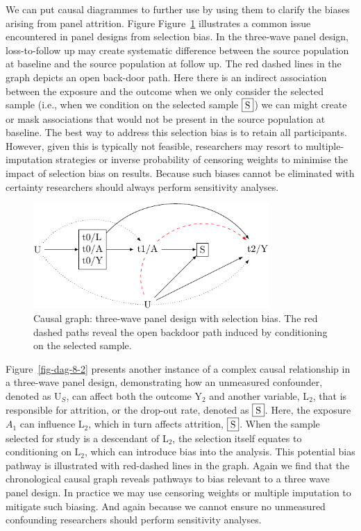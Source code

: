 \documentclass[
  singlecolumn]{report}
\begin{document}
We can put causal diagrammes to further use by using them to clarify the
biases arising from panel attrition. Figure Figure~\ref{fig-dag-8}
illustrates a common issue encountered in panel designs from selection
bias. In the three-wave panel design, loss-to-follow up may create
systematic difference between the source population at baseline and the
source population at follow up. The red dashed lines in the graph
depicts an open back-door path. Here there is an indirect association
between the exposure and the outcome when we only consider the selected
sample (i.e., when we condition on the selected sample \(\framebox{S}\))
we can might create or mask associations that would not be present in
the source population at baseline. The best way to address this
selection bias is to retain all participants. However, given this is
typically not feasible, researchers may resort to multiple-imputation
strategies or inverse probability of censoring weights to minimise the
impact of selection bias on results. Because such biases cannot be
eliminated with certainty researchers should always perform sensitivity
analyses.

\begin{figure}

{\centering \includegraphics[width=0.8\textwidth,height=\textheight]{causal-dags_files/figure-pdf/fig-dag-8-1.pdf}

}

\caption{\label{fig-dag-8}Causal graph: three-wave panel design with
selection bias. The red dashed paths reveal the open backdoor path
induced by conditioning on the selected sample.}

\end{figure}

Figure~\ref{fig-dag-8-2} presents another instance of a complex causal
relationship in a three-wave panel design, demonstrating how an
unmeasured confounder, denoted as U\(_S\), can affect both the outcome
Y\(_2\) and another variable, L\(_2\), that is responsible for
attrition, or the drop-out rate, denoted as \(\framebox{S}\). Here, the
exposure \(A_{1}\) can influence L\(_2\), which in turn affects
attrition, \(\framebox{S}\). When the sample selected for study is a
descendant of L\(_2\), the selection itself equates to conditioning on
L\(_2\), which can introduce bias into the analysis. This potential bias
pathway is illustrated with red-dashed lines in the graph. Again we find
that the chronological causal graph reveals pathways to bias relevant to
a three wave panel design. In practice we may use censoring weights or
multiple imputation to mitigate such biasing. And again because we
cannot ensure no unmeasured confounding researchers should perform
sensitivity analyses.
\end{document}
